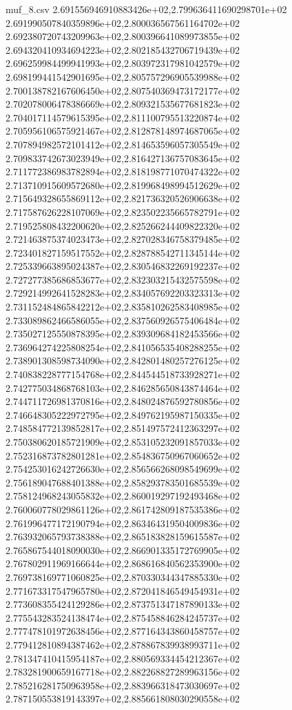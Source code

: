 \begin{filecontents*}{muf_8.csv}
2.691556946910883426e+02,2.799636411690298701e+02
2.691990507840359896e+02,2.800036567561164702e+02
2.692380720743209963e+02,2.800396641089973855e+02
2.694320410934694223e+02,2.802185432706719439e+02
2.696259984499941993e+02,2.803972317981042579e+02
2.698199441542901695e+02,2.805757296905539988e+02
2.700138782167606450e+02,2.807540369473172177e+02
2.702078006478386669e+02,2.809321535677681823e+02
2.704017114579615395e+02,2.811100795513220874e+02
2.705956106575921467e+02,2.812878148974687065e+02
2.707894982572101412e+02,2.814653596057305549e+02
2.709833742673023949e+02,2.816427136757083645e+02
2.711772386983782894e+02,2.818198771070474322e+02
2.713710915609572680e+02,2.819968498994512629e+02
2.715649328655869112e+02,2.821736320526906638e+02
2.717587626228107069e+02,2.823502235665782791e+02
2.719525808432200620e+02,2.825266244409822320e+02
2.721463875374023473e+02,2.827028346758379485e+02
2.723401827159517552e+02,2.828788542711345144e+02
2.725339663895024387e+02,2.830546832269192237e+02
2.727277385686853677e+02,2.832303215432575598e+02
2.729214992641528283e+02,2.834057692203323313e+02
2.731152484865842212e+02,2.835810262583408985e+02
2.733089862466586055e+02,2.837560926575406484e+02
2.735027125550878395e+02,2.839309684182453566e+02
2.736964274225808254e+02,2.841056535408288255e+02
2.738901308598734090e+02,2.842801480257276125e+02
2.740838228777154768e+02,2.844544518733928271e+02
2.742775034868768103e+02,2.846285650843874464e+02
2.744711726981370816e+02,2.848024876592780856e+02
2.746648305222972795e+02,2.849762195987150335e+02
2.748584772139852817e+02,2.851497572412363297e+02
2.750380620185721909e+02,2.853105232091857033e+02
2.752316873782801281e+02,2.854836750967060652e+02
2.754253016242726630e+02,2.856566268098549699e+02
2.756189047688401388e+02,2.858293783501685539e+02
2.758124968243055832e+02,2.860019297192493468e+02
2.760060778029861126e+02,2.861742809187535386e+02
2.761996477172190794e+02,2.863464319504009836e+02
2.763932065793738388e+02,2.865183828159615587e+02
2.765867544018090030e+02,2.866901335172769905e+02
2.767802911969166644e+02,2.868616840562353900e+02
2.769738169771060825e+02,2.870330344347885330e+02
2.771673317547965780e+02,2.872041846549454931e+02
2.773608355424129286e+02,2.873751347187890133e+02
2.775543283524138474e+02,2.875458846284245737e+02
2.777478101972638456e+02,2.877164343860458757e+02
2.779412810894387462e+02,2.878867839938993711e+02
2.781347410415954187e+02,2.880569334454212367e+02
2.783281900659167718e+02,2.882268827289963156e+02
2.785216281750963958e+02,2.883966318473030697e+02
2.787150553819143397e+02,2.885661808030290558e+02

\end{filecontents*}
